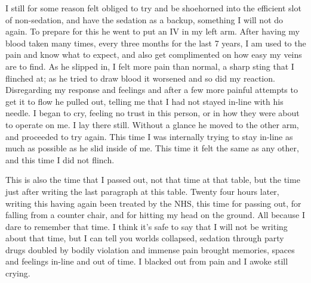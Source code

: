 I still for some reason felt obliged to try and be shoehorned into the
efficient slot of non-sedation, and have the sedation as a backup,
something I will not do again. To prepare for this he went to put an IV
in my left arm. After having my blood taken many times, every three
months for the last 7 years, I am used to the pain and know what to
expect, and also get complimented on how easy my veins are to find. As
he slipped in, I felt more pain than normal, a sharp sting that I
flinched at; as he tried to draw blood it worsened and so did my
reaction. Disregarding my response and feelings and after a few more
painful attempts to get it to flow he pulled out, telling me that I had
not stayed in-line with his needle. I began to cry, feeling no trust in
this person, or in how they were about to operate on me. I lay there
still. Without a glance he moved to the other arm, and proceeded to try
again. This time I was internally trying to stay in-line as much as
possible as he slid inside of me. This time it felt the same as any
other, and this time I did not flinch.

This is also the time that I passed out, not that time at that table,
but the time just after writing the last paragraph at this table. Twenty
four hours later, writing this having again been treated by the NHS,
this time for passing out, for falling from a counter chair, and for
hitting my head on the ground. All because I dare to remember that time.
I think it's safe to say that I will not be writing about that time, but
I can tell you worlds collapsed, sedation through party drugs doubled by
bodily violation and immense pain brought memories, spaces and feelings
in-line and out of time. I blacked out from pain and I awoke still
crying.

